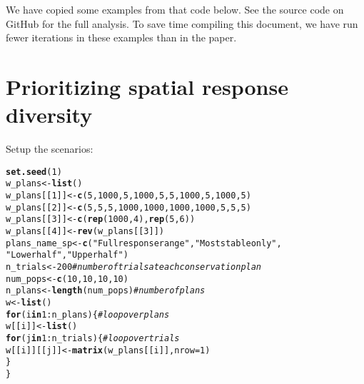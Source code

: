 \documentclass[10pt]{article}\usepackage[]{graphicx}\usepackage[]{color}
\makeatletter
\newcommand{\hlnum}[1]{\textcolor[rgb]{0.686,0.059,0.569}{#1}}%
\newcommand{\hlstr}[1]{\textcolor[rgb]{0.192,0.494,0.8}{#1}}%
\newcommand{\hlcom}[1]{\textcolor[rgb]{0.678,0.584,0.686}{\textit{#1}}}%
\newcommand{\hlopt}[1]{\textcolor[rgb]{0,0,0}{#1}}%
\newcommand{\hlstd}[1]{\textcolor[rgb]{0.345,0.345,0.345}{#1}}%
\newcommand{\hlkwa}[1]{\textcolor[rgb]{0.161,0.373,0.58}{\textbf{#1}}}%
\newcommand{\hlkwb}[1]{\textcolor[rgb]{0.69,0.353,0.396}{#1}}%
\newcommand{\hlkwc}[1]{\textcolor[rgb]{0.333,0.667,0.333}{#1}}%
\newcommand{\hlkwd}[1]{\textcolor[rgb]{0.737,0.353,0.396}{\textbf{#1}}}%
\newenvironment{kframe}{%
 \def\at@end@of@kframe{}%
 \ifinner\ifhmode%
  \def\at@end@of@kframe{\end{minipage}}%
  \begin{minipage}{\columnwidth}%
 \fi\fi%
 \def\FrameCommand##1{\hskip\@totalleftmargin \hskip-\fboxsep
 \colorbox{shadecolor}{##1}\hskip-\fboxsep
     \hskip-\linewidth \hskip-\@totalleftmargin \hskip\columnwidth}%
 \MakeFramed {\advance\hsize-\width
   \@totalleftmargin\z@ \linewidth\hsize
   \@setminipage}}%
 {\par\unskip\endMakeFramed%
 \at@end@of@kframe}
\newenvironment{knitrout}{}{} %
\makeatother
\begin{document}
We have copied some examples from that code below. See the source code on GitHub for the full analysis. To save time compiling this document, we have run fewer iterations in these examples than in the paper.

\section{Prioritizing spatial response diversity}

Setup the scenarios:

\begin{knitrout}
\color{fgcolor}\begin{kframe}
\begin{alltt}
\hlkwd{set.seed}\hlstd{(}\hlnum{1}\hlstd{)}
\hlstd{w_plans} \hlkwb{<-} \hlkwd{list}\hlstd{()}
\hlstd{w_plans[[}\hlnum{1}\hlstd{]]} \hlkwb{<-} \hlkwd{c}\hlstd{(}\hlnum{5}\hlstd{,} \hlnum{1000}\hlstd{,} \hlnum{5}\hlstd{,} \hlnum{1000}\hlstd{,} \hlnum{5}\hlstd{,} \hlnum{5}\hlstd{,} \hlnum{1000}\hlstd{,} \hlnum{5}\hlstd{,} \hlnum{1000}\hlstd{,} \hlnum{5}\hlstd{)}
\hlstd{w_plans[[}\hlnum{2}\hlstd{]]} \hlkwb{<-} \hlkwd{c}\hlstd{(}\hlnum{5}\hlstd{,} \hlnum{5}\hlstd{,} \hlnum{5}\hlstd{,} \hlnum{1000}\hlstd{,} \hlnum{1000}\hlstd{,} \hlnum{1000}\hlstd{,} \hlnum{1000}\hlstd{,} \hlnum{5}\hlstd{,} \hlnum{5}\hlstd{,} \hlnum{5}\hlstd{)}
\hlstd{w_plans[[}\hlnum{3}\hlstd{]]} \hlkwb{<-} \hlkwd{c}\hlstd{(}\hlkwd{rep}\hlstd{(}\hlnum{1000}\hlstd{,} \hlnum{4}\hlstd{),} \hlkwd{rep}\hlstd{(}\hlnum{5}\hlstd{,} \hlnum{6}\hlstd{))}
\hlstd{w_plans[[}\hlnum{4}\hlstd{]]} \hlkwb{<-} \hlkwd{rev}\hlstd{(w_plans[[}\hlnum{3}\hlstd{]])}
\hlstd{plans_name_sp} \hlkwb{<-} \hlkwd{c}\hlstd{(}\hlstr{"Full response range"}\hlstd{,} \hlstr{"Most stable only"}\hlstd{,}
  \hlstr{"Lower half"}\hlstd{,} \hlstr{"Upper half"}\hlstd{)}
\hlstd{n_trials} \hlkwb{<-} \hlnum{200} \hlcom{# number of trials at each conservation plan}
\hlstd{num_pops} \hlkwb{<-} \hlkwd{c}\hlstd{(}\hlnum{10}\hlstd{,} \hlnum{10}\hlstd{,} \hlnum{10}\hlstd{,} \hlnum{10}\hlstd{)}
\hlstd{n_plans} \hlkwb{<-} \hlkwd{length}\hlstd{(num_pops)} \hlcom{# number of plans}
\hlstd{w} \hlkwb{<-} \hlkwd{list}\hlstd{()}
\hlkwa{for}\hlstd{(i} \hlkwa{in} \hlnum{1}\hlopt{:}\hlstd{n_plans) \{} \hlcom{# loop over plans}
 \hlstd{w[[i]]} \hlkwb{<-} \hlkwd{list}\hlstd{()}
 \hlkwa{for}\hlstd{(j} \hlkwa{in} \hlnum{1}\hlopt{:}\hlstd{n_trials) \{} \hlcom{# loop over trials}
   \hlstd{w[[i]][[j]]} \hlkwb{<-} \hlkwd{matrix}\hlstd{(w_plans[[i]],} \hlkwc{nrow} \hlstd{=} \hlnum{1}\hlstd{)}
 \hlstd{\}}
\hlstd{\}}
\end{alltt}
\end{kframe}
\end{knitrout}
\end{document}
